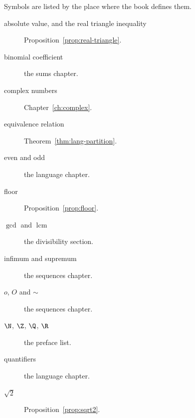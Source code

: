 \noindent Symbols are listed by the place where the book defines them.
\begin{description}
\item[absolute value, and the real triangle inequality] Proposition~\ref{prop:real-triangle}.
\item[binomial coefficient] the sums chapter.
\item[complex numbers] Chapter~\ref{ch:complex}.
\item[equivalence relation] Theorem~\ref{thm:lang-partition}.
\item[even and odd] the language chapter.
\item[floor] Proposition~\ref{prop:floor}.
\item[$\gcd$ and $\operatorname{lcm}$] the divisibility section.
\item[infimum and supremum] the sequences chapter.
\item[$o$, $O$ and $\sim$] the sequences chapter.
\item[$\N$, $\Z$, $\Q$, $\R$] the preface list.
\item[quantifiers] the language chapter.
\item[$\sqrt2$] Proposition~\ref{prop:sqrt2}.
\end{description}
